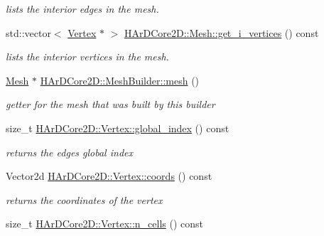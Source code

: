 \begin{DoxyCompactItemize}
\begin{DoxyCompactList}\small\item\em lists the interior edges in the mesh. \end{DoxyCompactList}\item 
\mbox{\label{group__Mesh_ga8f9f78dee50bb3c64136af58ee3468b4}} 
std\+::vector$<$ \hyperlink{classHArDCore2D_1_1Vertex}{Vertex} $\ast$ $>$ \hyperlink{group__Mesh_ga8f9f78dee50bb3c64136af58ee3468b4}{H\+Ar\+D\+Core2\+D\+::\+Mesh\+::get\+\_\+i\+\_\+vertices} () const
\begin{DoxyCompactList}\small\item\em lists the interior vertices in the mesh. \end{DoxyCompactList}\item 
\mbox{\label{group__Mesh_ga0cf325394142e077ffe05dd723cdeddc}} 
\hyperlink{classHArDCore2D_1_1Mesh}{Mesh} $\ast$ \hyperlink{group__Mesh_ga0cf325394142e077ffe05dd723cdeddc}{H\+Ar\+D\+Core2\+D\+::\+Mesh\+Builder\+::mesh} ()
\begin{DoxyCompactList}\small\item\em getter for the mesh that was built by this builder \end{DoxyCompactList}\item 
\mbox{\label{group__Mesh_gad19d3dca11de693ac4a454b2263eb179}} 
size\+\_\+t \hyperlink{group__Mesh_gad19d3dca11de693ac4a454b2263eb179}{H\+Ar\+D\+Core2\+D\+::\+Vertex\+::global\+\_\+index} () const
\begin{DoxyCompactList}\small\item\em returns the edges global index \end{DoxyCompactList}\item 
\mbox{\label{group__Mesh_gade92964c93627c034b021c1d23075a79}} 
Vector2d \hyperlink{group__Mesh_gade92964c93627c034b021c1d23075a79}{H\+Ar\+D\+Core2\+D\+::\+Vertex\+::coords} () const
\begin{DoxyCompactList}\small\item\em returns the coordinates of the vertex \end{DoxyCompactList}\item 
\mbox{\label{group__Mesh_gaae4e6a646ff79f705428c9063736aee1}} 
size\+\_\+t \hyperlink{group__Mesh_gaae4e6a646ff79f705428c9063736aee1}{H\+Ar\+D\+Core2\+D\+::\+Vertex\+::n\+\_\+cells} () const

\end{DoxyCompactItemize}
